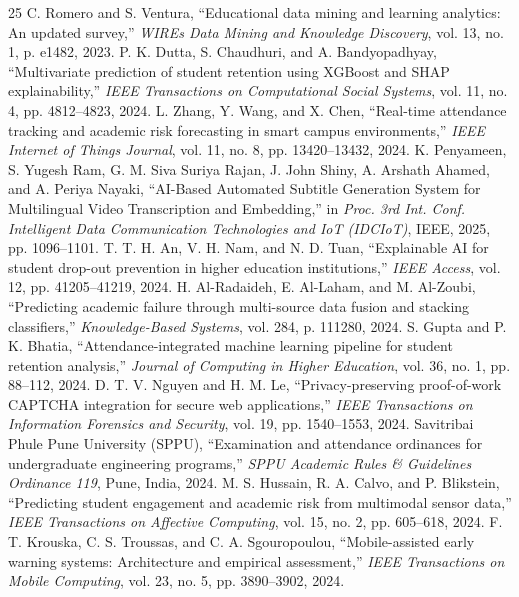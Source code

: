 \documentclass[conference]{IEEEtran}
\begin{document}
\begin{thebibliography}{25}
 C. Romero and S. Ventura, ``Educational data mining and learning analytics: An updated survey,'' \textit{WIREs Data Mining and Knowledge Discovery}, vol. 13, no. 1, p. e1482, 2023.
 P. K. Dutta, S. Chaudhuri, and A. Bandyopadhyay, ``Multivariate prediction of student retention using XGBoost and SHAP explainability,'' \textit{IEEE Transactions on Computational Social Systems}, vol. 11, no. 4, pp. 4812--4823, 2024.
 L. Zhang, Y. Wang, and X. Chen, ``Real-time attendance tracking and academic risk forecasting in smart campus environments,'' \textit{IEEE Internet of Things Journal}, vol. 11, no. 8, pp. 13420--13432, 2024.
 K. Penyameen, S. Yugesh Ram, G. M. Siva Suriya Rajan, J. John Shiny, A. Arshath Ahamed, and A. Periya Nayaki, ``AI-Based Automated Subtitle Generation System for Multilingual Video Transcription and Embedding,'' in \textit{Proc. 3rd Int. Conf. Intelligent Data Communication Technologies and IoT (IDCIoT)}, IEEE, 2025, pp. 1096--1101.
 T. T. H. An, V. H. Nam, and N. D. Tuan, ``Explainable AI for student drop-out prevention in higher education institutions,'' \textit{IEEE Access}, vol. 12, pp. 41205--41219, 2024.
 H. Al-Radaideh, E. Al-Laham, and M. Al-Zoubi, ``Predicting academic failure through multi-source data fusion and stacking classifiers,'' \textit{Knowledge-Based Systems}, vol. 284, p. 111280, 2024.
 S. Gupta and P. K. Bhatia, ``Attendance-integrated machine learning pipeline for student retention analysis,'' \textit{Journal of Computing in Higher Education}, vol. 36, no. 1, pp. 88--112, 2024.
 D. T. V. Nguyen and H. M. Le, ``Privacy-preserving proof-of-work CAPTCHA integration for secure web applications,'' \textit{IEEE Transactions on Information Forensics and Security}, vol. 19, pp. 1540--1553, 2024.
 Savitribai Phule Pune University (SPPU), ``Examination and attendance ordinances for undergraduate engineering programs,'' \textit{SPPU Academic Rules \& Guidelines Ordinance 119}, Pune, India, 2024.
 M. S. Hussain, R. A. Calvo, and P. Blikstein, ``Predicting student engagement and academic risk from multimodal sensor data,'' \textit{IEEE Transactions on Affective Computing}, vol. 15, no. 2, pp. 605--618, 2024.
 F. T. Krouska, C. S. Troussas, and C. A. Sgouropoulou, ``Mobile-assisted early warning systems: Architecture and empirical assessment,'' \textit{IEEE Transactions on Mobile Computing}, vol. 23, no. 5, pp. 3890--3902, 2024.

\end{thebibliography}
\end{document}
